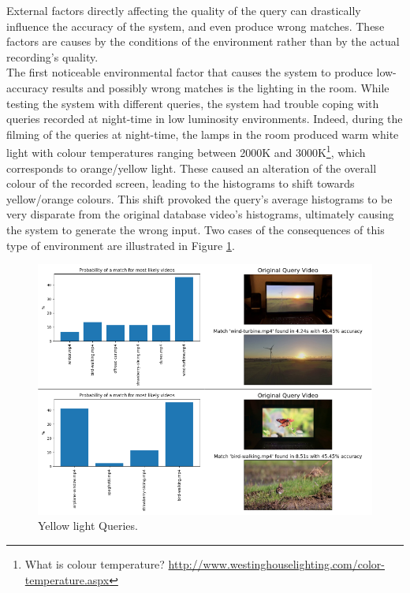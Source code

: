 External factors directly affecting the quality of the query can drastically influence the accuracy of the system, and even produce wrong matches. These factors are causes by the conditions of the environment rather than by the actual recording's quality.\\

The first noticeable environmental factor that causes the system to produce low-accuracy results and possibly wrong matches is the lighting in the room. While testing the system with different queries, the system had trouble coping with queries recorded at night-time in low luminosity environments. Indeed, during the filming of the queries at night-time, the lamps in the room produced warm white light with colour temperatures ranging between 2000K and 3000K\footnote{What is colour temperature? \url{http://www.westinghouselighting.com/color-temperature.aspx}}, which corresponds to orange/yellow light. These caused an alteration of the overall colour of the recorded screen, leading to the histograms to shift towards yellow/orange colours. This shift provoked the query's average histograms to be very disparate from the original database video's histograms, ultimately causing the system to generate the wrong input. Two cases of the consequences of this type of environment are illustrated in Figure \ref{fig:evaluation-yellow-light-queries}. %

\begin{figure}[h] 
\centerline{\includegraphics[width=\textwidth]{figures/evaluation/yellow-light-queries.png}}
\caption{\label{fig:evaluation-yellow-light-queries}Yellow light Queries.}
\end{figure}


